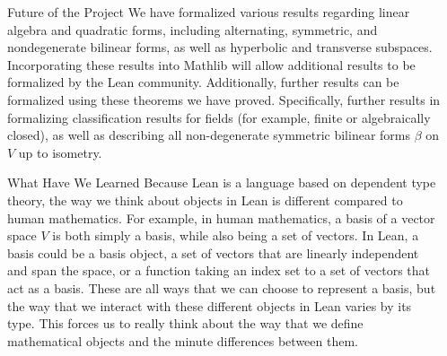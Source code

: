 \documentclass[final]{beamer}
\newlength{\sepwidth}
\newlength{\colwidth}
\newcommand{\separatorcolumn}{\begin{column}{\sepwidth}\end{column}}
\begin{document}
\begin{frame}[t]
\begin{columns}[t]
\separatorcolumn

\begin{column}{\colwidth}



  \begin{exampleblock}{{\LARGE Future of the Project}}
 {\large
  We have formalized various results regarding linear algebra and quadratic forms, including alternating, symmetric, and nondegenerate bilinear forms, as well as hyperbolic and transverse subspaces. Incorporating these results into Mathlib will allow additional results to be formalized by the Lean community. Additionally, further results can be formalized using these theorems we have proved. Specifically, further results in formalizing classification results for fields (for example, finite or algebraically closed), as well as describing all non-degenerate symmetric bilinear forms $\beta$ on $V$ up to isometry.
  }

  {\large
    }

  \end{exampleblock}


  \begin{exampleblock}{{\LARGE What Have We Learned}}
 {\large
  Because Lean is a language based on dependent type theory, the way we think about objects in Lean is different compared to human mathematics. For example, in human mathematics, a basis of a vector space $V$ is both simply a basis, while also being a set of vectors. In Lean, a basis could be a basis object, a set of vectors that are linearly independent and span the space, or a function taking an index set to a set of vectors that act as a basis. These are all ways that we can choose to represent a basis, but the way that we interact with these different objects in Lean varies by its type. This forces us to really think about the way that we define mathematical objects and the minute differences between them. 
  }


\end{exampleblock}
\end{column}
\end{columns}
\end{frame}
\end{document}
